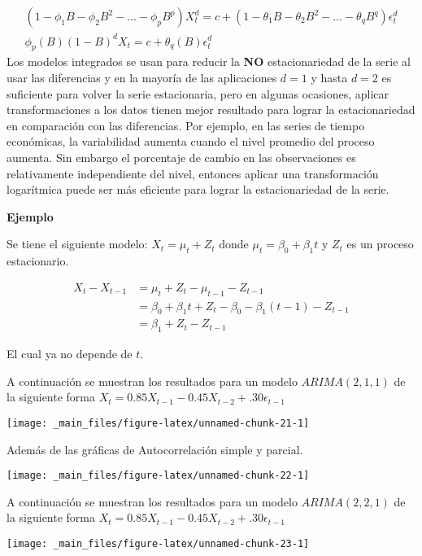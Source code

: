 \documentclass[
  a4paper,
  oneside,
  openany]{book}
\begin{document}
\[
\begin{array}{c}
(1-\phi_1B-\phi_2B^2-...-\phi_pB^p)X_t^d=c+(1-\theta_1B-\theta_2B^2-...-\theta_qB^q)\epsilon_t^d\\
\phi_p(B)(1-B)^dX_t=c+\theta_q(B)\epsilon_t^d
\end{array}
\]
Los modelos integrados se usan para reducir la \textbf{NO} estacionariedad de la serie al usar las diferencias y en la mayoría de las aplicaciones \(d=1\) y hasta \(d=2\) es suficiente para volver la serie estacionaria, pero en algunas ocasiones, aplicar transformaciones a los datos tienen mejor resultado para lograr la estacionariedad en comparación con las diferencias. Por ejemplo, en las series de tiempo económicas, la variabilidad aumenta cuando el nivel promedio del proceso aumenta. Sin embargo el porcentaje de cambio en las observaciones es relativamente independiente del nivel, entonces aplicar una transformación logarítmica puede ser más eficiente para lograr la estacionariedad de la serie.

\textbf{Ejemplo}

Se tiene el siguiente modelo: \(X_t = \mu_t +Z_t\) donde \(\mu_t = \beta_0+\beta_1t\) y \(Z_t\) es un proceso estacionario.

\[
\begin{split}
X_t -X_{t-1} &= \mu_t+Z_t-\mu_{t-1}-Z_{t-1}\\
& = \beta_0+\beta_1t+Z_t-\beta_0-\beta_1(t-1)-Z_{t-1}\\
& = \beta_1+Z_t-Z_{t-1}
\end{split}
\]

El cual ya no depende de \(t\).

A continuación se muestran los resultados para un modelo \(ARIMA(2,1,1)\) de la siguiente forma \(X_t=0.85X_{t-1}-0.45X_{t-2}+.30\epsilon_{t-1}\)

\begin{center}\texttt{[image: \_main\_files/figure-latex/unnamed-chunk-21-1]} \end{center}

Además de las gráficas de Autocorrelación simple y parcial.

\begin{center}\texttt{[image: \_main\_files/figure-latex/unnamed-chunk-22-1]} \end{center}

A continuación se muestran los resultados para un modelo \(ARIMA(2,2,1)\) de la siguiente forma \(X_t=0.85X_{t-1}-0.45X_{t-2}+.30\epsilon_{t-1}\)

\begin{center}\texttt{[image: \_main\_files/figure-latex/unnamed-chunk-23-1]} \end{center}
\end{document}
